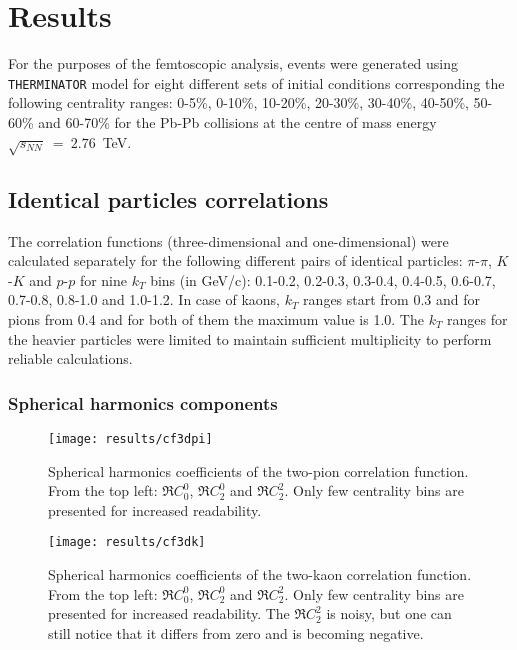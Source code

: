 \chapter{Results}
  For the purposes of the femtoscopic analysis, events were generated using \verb|THERMINATOR| model for eight different sets of initial conditions corresponding the following centrality ranges: 0-5\%, 0-10\%, 10-20\%, 20-30\%, 30-40\%, 40-50\%, 50-60\% and 60-70\% for the Pb-Pb collisions at the centre of mass energy $\sqrt{s_{NN}}~=~2.76$~TeV.
  \section{Identical particles correlations}
    The correlation functions (three-dimensional and one-dimensional) were calculated separately for the following different pairs of identical particles: $\pi$-$\pi$, $K$-$K$ and  $p$-$p$ for nine $k_T$ bins (in GeV/c): 0.1-0.2, 0.2-0.3, 0.3-0.4, 0.4-0.5, 0.6-0.7, 0.7-0.8, 0.8-1.0 and 1.0-1.2.
    In case of kaons, $k_T$ ranges start from 0.3 and for pions from 0.4 and for both of them the maximum value is 1.0.
    The $k_T$ ranges for the heavier particles were limited to maintain sufficient multiplicity to perform reliable calculations.
    \subsection{Spherical harmonics components}

      \begin{figure}[b]
        \centering
        \centerline{\texttt{[image: results/cf3dpi]}}
        \caption{Spherical harmonics coefficients of the two-pion correlation function. From the top left: $\Re C^0_0$, $\Re C^0_2$ and $\Re C^2_2$. Only few centrality bins are presented for increased readability.}
      \label{fig:cf3dpi}
      \end{figure}

      \begin{figure}[b]
        \centering
        \centerline{\texttt{[image: results/cf3dk]}}
        \caption{Spherical harmonics coefficients of the two-kaon correlation function. From the top left: $\Re C^0_0$, $\Re C^0_2$ and $\Re C^2_2$. Only few centrality bins are presented for increased readability. The $\Re C^2_2$ is noisy, but one can still notice that it differs from zero and is becoming negative.}
      \label{fig:cf3dk}
      \end{figure} 

